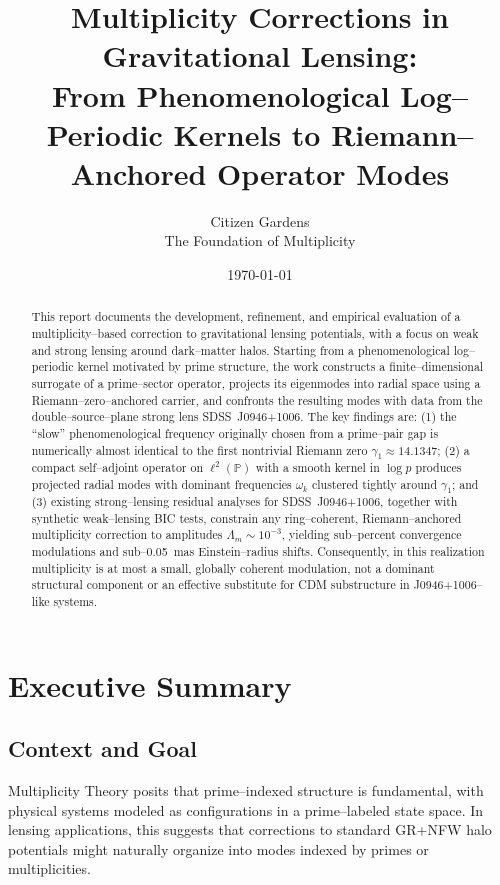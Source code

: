 \documentclass[11pt]{article}
\title{Multiplicity Corrections in Gravitational Lensing:\\
From Phenomenological Log--Periodic Kernels to Riemann--Anchored Operator Modes}
\author{%
  Citizen Gardens \\ The Foundation of Multiplicity
}
\date{\today}
\begin{document}
\maketitle

\begin{abstract}
This report documents the development, refinement, and empirical evaluation of a multiplicity--based correction to gravitational lensing potentials, with a focus on weak and strong lensing around dark--matter halos. Starting from a phenomenological log--periodic kernel motivated by prime structure, the work constructs a finite--dimensional surrogate of a prime--sector operator, projects its eigenmodes into radial space using a Riemann--zero--anchored carrier, and confronts the resulting modes with data from the double--source--plane strong lens SDSS~J0946+1006. The key findings are:
(1) the ``slow'' phenomenological frequency originally chosen from a prime--pair gap is numerically almost identical to the first nontrivial Riemann zero $\gamma_1 \approx 14.1347$;
(2) a compact self--adjoint operator on $\ell^2(\mathbb{P})$ with a smooth kernel in $\log p$ produces projected radial modes with dominant frequencies $\omega_k$ clustered tightly around $\gamma_1$; and
(3) existing strong--lensing residual analyses for SDSS~J0946+1006, together with synthetic weak--lensing BIC tests, constrain any ring--coherent, Riemann--anchored multiplicity correction to amplitudes $\Lambda_m \sim 10^{-3}$, yielding sub--percent convergence modulations and sub--0.05~mas Einstein--radius shifts.
Consequently, in this realization multiplicity is at most a small, globally coherent modulation, not a dominant structural component or an effective substitute for CDM substructure in J0946+1006--like systems.
\end{abstract}
\newpage
\tableofcontents
\newpage
\section{Executive Summary}

\subsection{Context and Goal}

Multiplicity Theory posits that prime--indexed structure is fundamental, with physical systems modeled as configurations in a prime--labeled state space. In lensing applications, this suggests that corrections to standard GR+NFW halo potentials might naturally organize into modes indexed by primes or multiplicities.
\end{document}

